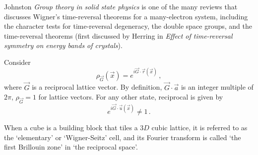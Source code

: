 Johnston {\em Group theory in solid state physics} is
one of the many reviews that
discusses Wigner's time-reversal theorems for a many-electron system,
including the character tests for time-reversal degeneracy, the double space
groups, and the time-reversal theorems (first discussed by
Herring in {\em Effect of time-reversal symmetry on energy
bands of crystals}).

Consider
\[
\rho_{\vec{G}}(\vec{x})= e^{i\vec{G}\cdot\vec{r}(\vec{x})}
\,,
\]
where $\vec{G}$ is a reciprocal lattice vector. By definition,
$\vec{G}\cdot\vec{a}$ is an integer multiple of $2\pi$, $\rho_{\vec{G}}=1$ for
lattice vectors.
For any other state, reciprocal {\lattstate} is given by
\[
e^{i\vec{G}\cdot\vec{u}(\vec{x})} \neq 1
\,.
\]

When a
cube is a building block that tiles a $3D$ cubic lattice, it is referred
to as the `elementary' or `Wigner-Seitz' cell, and its Fourier transform
is called `the first Brillouin zone' in `the reciprocal space'.

